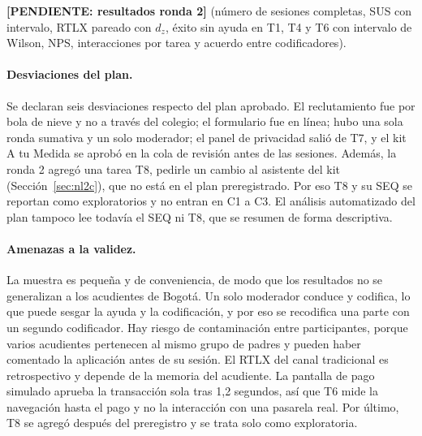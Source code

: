 \textbf{[PENDIENTE: resultados ronda 2]} (número de sesiones completas, SUS con intervalo, RTLX
pareado con $d_z$, éxito sin ayuda en T1, T4 y T6 con intervalo de Wilson, NPS, interacciones por
tarea y acuerdo entre codificadores).

\paragraph{Desviaciones del plan.} Se declaran seis desviaciones respecto del plan aprobado. El
reclutamiento fue por bola de nieve y no a través del colegio; el formulario fue en línea; hubo una
sola ronda sumativa y un solo moderador; el panel de privacidad salió de T7, y el kit A tu Medida se
aprobó en la cola de revisión antes de las sesiones. Además, la ronda 2 agregó una tarea T8, pedirle
un cambio al asistente del kit (Sección~\ref{sec:nl2c}), que no está en el plan preregistrado. Por
eso T8 y su SEQ se reportan como exploratorios y no entran en C1 a C3. El análisis automatizado
del plan tampoco lee todavía el SEQ ni T8, que se resumen de forma descriptiva.

\paragraph{Amenazas a la validez.} La muestra es pequeña y de conveniencia, de modo que los
resultados no se generalizan a los acudientes de Bogotá. Un solo moderador conduce y codifica, lo
que puede sesgar la ayuda y la codificación, y por eso se recodifica una parte con un segundo
codificador. Hay riesgo de contaminación entre participantes, porque varios acudientes pertenecen
al mismo grupo de padres y pueden haber comentado la aplicación antes de su sesión. El RTLX del
canal tradicional es retrospectivo y depende de la memoria del acudiente. La pantalla de pago
simulado aprueba la transacción sola tras 1,2 segundos, así que T6 mide la navegación hasta el
pago y no la interacción con una pasarela real. Por último, T8 se agregó después del
preregistro y se trata solo como exploratoria.
